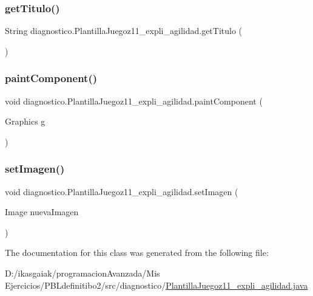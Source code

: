 \subsubsection{\texorpdfstring{get\+Titulo()}{getTitulo()}}
{\footnotesize\ttfamily String diagnostico.\+Plantilla\+Juegoz11\+\_\+expli\+\_\+agilidad.\+get\+Titulo (\begin{DoxyParamCaption}{ }\end{DoxyParamCaption})}

\mbox{\label{classdiagnostico_1_1_plantilla_juegoz11__expli__agilidad_a9571e9ed8cb0655942c37ee723d7f9e8}} 
\subsubsection{\texorpdfstring{paint\+Component()}{paintComponent()}}
{\footnotesize\ttfamily void diagnostico.\+Plantilla\+Juegoz11\+\_\+expli\+\_\+agilidad.\+paint\+Component (\begin{DoxyParamCaption}\item[{Graphics}]{g }\end{DoxyParamCaption})\hspace{0.3cm}{\ttfamily [protected]}}

\mbox{\label{classdiagnostico_1_1_plantilla_juegoz11__expli__agilidad_a3937d1d82916f6f57221626caa12db58}} 
\subsubsection{\texorpdfstring{set\+Imagen()}{setImagen()}}
{\footnotesize\ttfamily void diagnostico.\+Plantilla\+Juegoz11\+\_\+expli\+\_\+agilidad.\+set\+Imagen (\begin{DoxyParamCaption}\item[{Image}]{nueva\+Imagen }\end{DoxyParamCaption})}



The documentation for this class was generated from the following file\+:\begin{DoxyCompactItemize}
\item 
D\+:/ikasgaiak/programacion\+Avanzada/\+Mis Ejercicios/\+P\+B\+Ldefinitibo2/src/diagnostico/\mbox{\hyperlink{_plantilla_juegoz11__expli__agilidad_8java}{Plantilla\+Juegoz11\+\_\+expli\+\_\+agilidad.\+java}}\end{DoxyCompactItemize}
